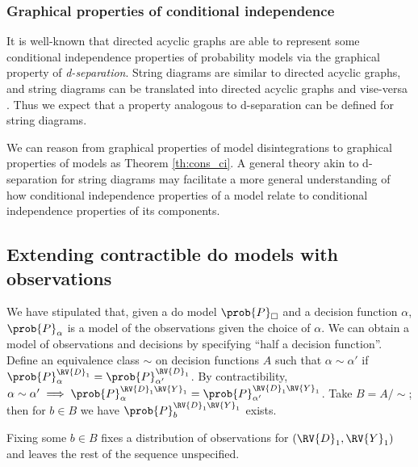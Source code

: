 

\subsubsection{Graphical properties of conditional independence}

It is well-known that directed acyclic graphs are able to represent some conditional independence properties of probability models via the graphical property of \emph{d-separation}. String diagrams are similar to directed acyclic graphs, and string diagrams can be translated into directed acyclic graphs and vise-versa \citep{fong_causal_2013}. Thus we expect that a property analogous to d-separation can be defined for string diagrams.

We can reason from graphical properties of model disintegrations to graphical properties of models as Theorem \ref{th:cons_ci}. A general theory akin to d-separation for string diagrams may facilitate a more general understanding of how conditional independence properties of a model relate to conditional independence properties of its components.


\subsection{Extending contractible do models with observations}

We have stipulated that, given a do model $\prob{P}_\square$ and a decision function $\alpha$, $\prob{P}_\alpha$ is a model of the observations given the choice of $\alpha$. We can obtain a model of observations and decisions by specifying ``half a decision function''. Define an equivalence class $\sim$ on decision functions $A$ such that $\alpha\sim\alpha'$ if $\prob{P}_\alpha^{\RV{D}_1}=\prob{P}_{\alpha'}^{\RV{D}_1}$. By contractibility, $\alpha\sim\alpha'\implies \prob{P}_\alpha^{\RV{D}_1\RV{Y}_1}=\prob{P}_{\alpha'}^{\RV{D}_1\RV{Y}_1}$. Take $B=A/\sim$; then for $b\in B$ we have $\prob{P}_b^{\RV{D}_1\RV{Y}_1}$ exists.

Fixing some $b\in B$ fixes a distribution of observations for $(\RV{D}_1,\RV{Y}_1)$ and leaves the rest of the sequence unspecified.

